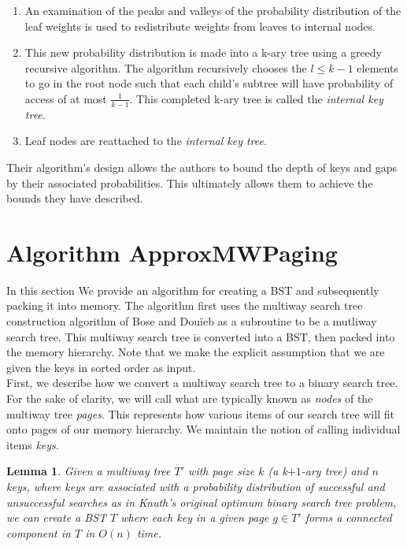 \documentclass[letterpaper,12pt,titlepage,oneside,final]{book}
\theoremstyle{plain}
\newtheorem{lem}[thm]{Lemma}
\begin{document}
\begin{enumerate}
\item An examination of the peaks and valleys of the probability distribution of the leaf weights is used to redistribute weights from leaves to internal nodes. 

\item This new probability distribution is made into a k-ary tree using a greedy recursive algorithm. The algorithm recursively chooses the $l \leq k-1$ elements to go in the root node such that each child's subtree will have probability of access of at most $\frac{1}{k-1}$. This completed k-ary tree is called the \textit{internal key tree}. 

\item Leaf nodes are reattached to the \textit{internal key tree}.
\end{enumerate}

 Their algorithm's design allows the authors to bound the depth of keys and gaps by their associated probabilities. This ultimately allows them to achieve the bounds they have described. 

\section{Algorithm ApproxMWPaging}\label{Algorithm ApproxMWPaging}

In this section We provide an algorithm for creating a BST and subsequently packing it into memory. The algorithm first uses the multiway search tree construction algorithm of Bose and Dou\"{i}eb as a subroutine to be a mutliway search tree. This multiway search tree is converted into a BST, then packed into the memory hierarchy. Note that we make the explicit assumption that we are given the keys in sorted order as input. \\

First, we describe how we convert a multiway search tree to a binary search tree. For the sake of clarity, we will call what are typically known as \textit{nodes} of the multiway tree \textit{pages}. This represents how various items of our search tree will fit onto pages of our memory hierarchy. We maintain the notion of calling individual items \textit{keys}.

\begin{lem}\label{MWTBSTLem}
Given a multiway tree $T'$ with page size $k$ (a k$+1$-ary tree) and $n$ keys, where keys are associated with a probability distribution of successful and unsuccessful searches as in Knuth's original optimum binary search tree problem, we can create a BST $T$ where each key in a given page $g \in T'$ forms a connected component in $T$ in $O(n)$ time.
\end{lem}
\end{document}
